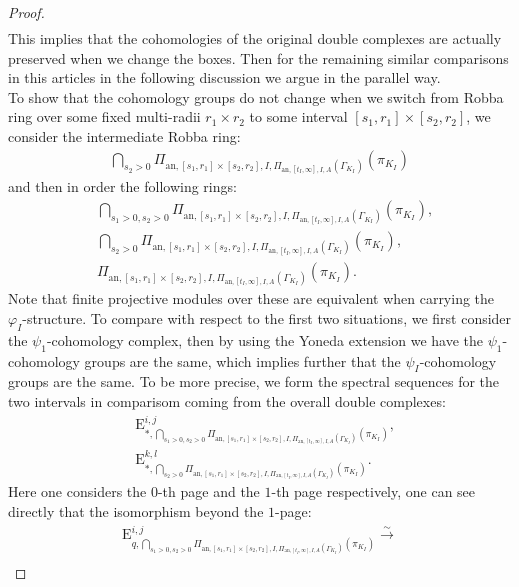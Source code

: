 \documentclass[12pt]{amsart}
\theoremstyle{definition}
\numberwithin{equation}{section}
\begin{document}
\begin{proof}
\begin{align}
\end{align}
This implies that the cohomologies of the original double complexes are actually preserved when we change the boxes. Then for the remaining similar comparisons in this articles in the following discussion we argue in the parallel way. \\
\indent To show that the cohomology groups do not change when we switch from Robba ring over some fixed multi-radii $r_{1}\times r_{2}$ to some interval $[s_1,r_1]\times [s_2,r_2]$, we consider the  intermediate Robba ring:
\begin{align}
\bigcap_{s_2>0} \Pi_{\mathrm{an},[s_1,r_1]\times [s_2,r_{2}],I,\Pi_{\mathrm{an},[t_I,\infty],I,A}(\Gamma_{K_I})}(\pi_{K_I})	
\end{align}
and then in order the following rings:
\begin{align}
&\bigcap_{s_1>0,s_2>0} \Pi_{\mathrm{an},[s_1,r_{1}]\times [s_2,r_{2}],I,\Pi_{\mathrm{an},[t_I,\infty],I,A}(\Gamma_{K_I})}(\pi_{K_I}),\\
&\bigcap_{s_2>0} \Pi_{\mathrm{an},[s_1,r_{1}]\times [s_2,r_{2}],I,\Pi_{\mathrm{an},[t_I,\infty],I,A}(\Gamma_{K_I})}(\pi_{K_I}),\\
& \Pi_{\mathrm{an},[s_1,r_{1}]\times [s_2,r_{2}],I,\Pi_{\mathrm{an},[t_I,\infty],I,A}(\Gamma_{K_I})}(\pi_{K_I}).
\end{align}
Note that finite projective modules over these are equivalent when carrying the  $\varphi_I$-structure. To compare with respect to the first two situations, we first consider the $\psi_1$-cohomology complex, then by using the Yoneda extension we have the  $\psi_1$-cohomology groups are the same, which implies further that the  $\psi_I$-cohomology groups are the same. To be more precise, we form the spectral sequences for the two intervals in comparisom coming from the overall double complexes:
\begin{align}
&\mathrm{E}^{i,j}_{*,\bigcap_{s_1>0,s_2>0} \Pi_{\mathrm{an},[s_1,r_{1}]\times [s_2,r_{2}],I,\Pi_{\mathrm{an},[t_I,\infty],I,A}(\Gamma_{K_I})}(\pi_{K_I})},\\
&\mathrm{E}^{k,l}_{*,\bigcap_{s_2>0} \Pi_{\mathrm{an},[s_1,r_{1}]\times [s_2,r_{2}],I,\Pi_{\mathrm{an},[t_I,\infty],I,A}(\Gamma_{K_I})}(\pi_{K_I})}.
\end{align}
Here one considers the $0$-th page and the $1$-th page respectively, one can see directly that the isomorphism beyond the $1$-page:
\begin{align}
\mathrm{E}^{i,j}_{q,\bigcap_{s_1>0,s_2>0} \Pi_{\mathrm{an},[s_1,r_{1}]\times [s_2,r_{2}],I,\Pi_{\mathrm{an},[t_I,\infty],I,A}(\Gamma_{K_I})}(\pi_{K_I})}\overset{\sim}{\longrightarrow}\\

\end{align}
\end{proof}
\end{document}
